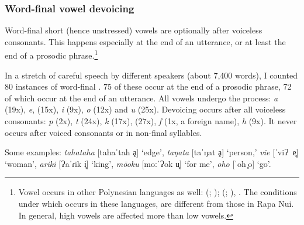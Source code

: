  \largerpage
\subsubsection[Word{}-final vowel \isi{devoicing}]{Word-final vowel devoicing}\label{sec:2.5.1.1}
Word-final short (hence unstressed) vowels are optionally  after voiceless consonants. This happens especially at the end of an utterance, or at least the end of a prosodic phrase.\footnote{\label{fn:61}Vowel  occurs in other Polynesian languages as well:  (\citealt[76]{Harlow2007Maori}; \citealt[556]{Bauer1993});  (\citealt[23-25]{Tsukamoto1988}; \citealt{DeLacy2001}),  \citep[137]{Feldman1978}. The conditions under which  occurs in these languages, are different from those in Rapa Nui. In general, high vowels are affected more than low vowels.}

In a stretch of careful speech by different speakers (about 7,400 words), I counted 80 instances of word-final . 75 of these occur at the end of a prosodic phrase, 72 of which occur at the end of an utterance. All vowels undergo the process: \textit{a} (19x), \textit{e}, (15x), \textit{i} (9x), \textit{o} (12x) and \textit{u} (25x). Devoicing occurs after all voiceless consonants: \textit{p} (2x), \textit{t} (24x), \textit{k} (17x), \textit{{\ꞌ}} (27x), \textit{f} (1x, a foreign name), \textit{h} (9x). It never occurs after voiced consonants or in non-final syllables. 

{\sloppy
Some examples: 
\textit{tahataha} [tahaˈtah%
ḁ] ‘edge’, 
%
\textit{taŋata} [taˈŋat%
ḁ] ‘person,’ 
%
\textit{vi{\ꞌ}e} \mbox{[ˈviɁ%
e̥]} ‘wom\-an’, 
%
\textit{{\ꞌ}ariki} [Ɂaˈɾik%
i̥] ‘king’, 
%
\textit{mō{\ꞌ}oku} [moːˈɁok%
u̥] ‘for me’, 
%
\textit{oho} \mbox{[ˈoh%
̥o]} ‘go’.
}

